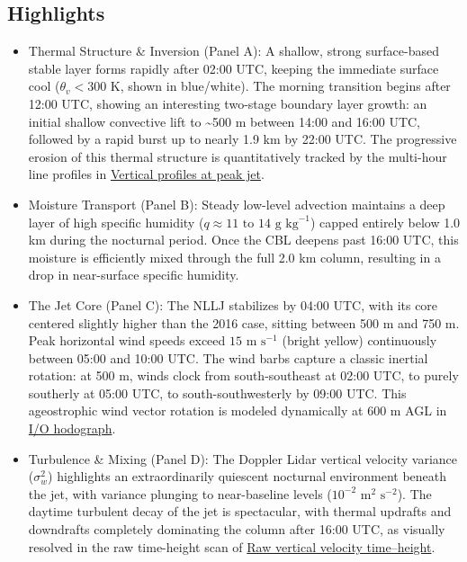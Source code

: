 \documentclass[11pt]{article}
\begin{document}
\subsection*{Highlights}
\begin{itemize}
  \item Thermal Structure \& Inversion (Panel A): A shallow, strong surface-based stable layer forms rapidly after 02:00 UTC, keeping the immediate surface cool ($\theta_v < 300\text{ K}$, shown in blue/white). The morning transition begins after 12:00 UTC, showing an interesting two-stage boundary layer growth: an initial shallow convective lift to \textasciitilde{}500 m between 14:00 and 16:00 UTC, followed by a rapid burst up to nearly 1.9 km by 22:00 UTC. The progressive erosion of this thermal structure is quantitatively tracked by the multi-hour line profiles in \hyperref[fig:nllj_c1:nllj_c1_aux_vertical_profiles_peak_jet]{Vertical profiles at peak jet}.
  \item Moisture Transport (Panel B): Steady low-level advection maintains a deep layer of high specific humidity ($q \approx 11\text{ to }14\text{ g kg}^{-1}$) capped entirely below 1.0 km during the nocturnal period. Once the CBL deepens past 16:00 UTC, this moisture is efficiently mixed through the full 2.0 km column, resulting in a drop in near-surface specific humidity.
  \item The Jet Core (Panel C): The NLLJ stabilizes by 04:00 UTC, with its core centered slightly higher than the 2016 case, sitting between 500 m and 750 m. Peak horizontal wind speeds exceed $15\text{ m s}^{-1}$ (bright yellow) continuously between 05:00 and 10:00 UTC. The wind barbs capture a classic inertial rotation: at 500 m, winds clock from south-southeast at 02:00 UTC, to purely southerly at 05:00 UTC, to south-southwesterly by 09:00 UTC. This ageostrophic wind vector rotation is modeled dynamically at 600 m AGL in \hyperref[fig:nllj_c1:nllj_c1_aux_io_hodograph]{I/O hodograph}.
  \item Turbulence \& Mixing (Panel D): The Doppler Lidar vertical velocity variance ($\sigma_w^2$) highlights an extraordinarily quiescent nocturnal environment beneath the jet, with variance plunging to near-baseline levels ($10^{-2}\text{ m}^2\text{ s}^{-2}$). The daytime turbulent decay of the jet is spectacular, with thermal updrafts and downdrafts completely dominating the column after 16:00 UTC, as visually resolved in the raw time-height scan of \hyperref[fig:nllj_c1:nllj_c1_aux_raw_w_timeheight]{Raw vertical velocity time–height}.
\end{itemize}
\end{document}
